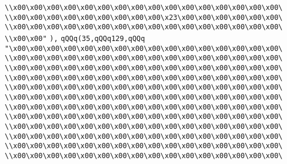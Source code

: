 \verb|\\x00\x00\x00\x00\x00\x00\x00\x00\x00\x00\x00\x00\x00\x00\x00\x00\|\newline
\verb|\\x00\x00\x00\x00\x00\x00\x00\x00\x00\x23\x00\x00\x00\x00\x00\x00\|\newline
\verb|\\x00\x00\x00\x00\x00\x00\x00\x00\x00\x00\x00\x00\x00\x00\x00\x00\|\newline
\verb|\\x00\x00"|\newline
\verb|),|\newline
\verb|qQQq(35,qQQq129,qQQq|\newline
\verb|"\x00\x00\x00\x00\x00\x00\x00\x00\x00\x00\x00\x00\x00\x00\x00\x00\|\newline
\verb|\\x00\x00\x00\x00\x00\x00\x00\x00\x00\x00\x00\x00\x00\x00\x00\x00\|\newline
\verb|\\x00\x00\x00\x00\x00\x00\x00\x00\x00\x00\x00\x00\x00\x00\x00\x00\|\newline
\verb|\\x00\x00\x00\x00\x00\x00\x00\x00\x00\x00\x00\x00\x00\x00\x00\x00\|\newline
\verb|\\x00\x00\x00\x00\x00\x00\x00\x00\x00\x00\x00\x00\x00\x00\x00\x00\|\newline
\verb|\\x00\x00\x00\x00\x00\x00\x00\x00\x00\x00\x00\x00\x00\x00\x00\x00\|\newline
\verb|\\x00\x00\x00\x00\x00\x00\x00\x00\x00\x00\x00\x00\x00\x00\x00\x00\|\newline
\verb|\\x00\x00\x00\x00\x00\x00\x00\x00\x00\x00\x00\x00\x00\x00\x00\x00\|\newline
\verb|\\x00\x00\x00\x00\x00\x00\x00\x00\x00\x00\x00\x00\x00\x00\x00\x00\|\newline
\verb|\\x00\x00\x00\x00\x00\x00\x00\x00\x00\x00\x00\x00\x00\x00\x00\x00\|\newline
\verb|\\x00\x00\x00\x00\x00\x00\x00\x00\x00\x00\x00\x00\x00\x00\x00\x00\|\newline
\verb|\\x00\x00\x00\x00\x00\x00\x00\x00\x00\x00\x00\x00\x00\x00\x00\x00\|\newline
